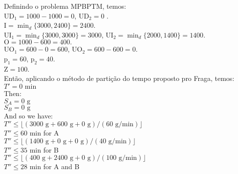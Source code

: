 \documentclass[authoryear,preprint,12pt]{elsarticle}
\begin{document}
Definindo o problema MPBPTM, temos: \\

$\textrm{UD}_{1} = 1000 - 1000 = 0$,
$\textrm{UD}_{2} = 0$ . \\

$\textrm{I} = \min_{d} \{3000, 2400\} = 2400$. \\

$ \textrm{UI}_{1} = \min_{d} \{3000, 3000\} = 3000 $,
$ \textrm{UI}_{2} = \min_{d} \{2000, 1400\} = 1400 $. \\

$\textrm{O} = 1000 - 600 = 400.$ \\

$\textrm{UO}_{1} = 600 - 0 = 600$, 
$\textrm{UO}_{2} = 600 - 600 = 0$. \\

$\textrm{p}_{1} = 60$,
$\textrm{p}_{2} = 40$.  \\

$\textrm{Z} = 100$.  \\

Então, aplicando o método de partição do tempo proposto pro Fraga, temos: \\

$T' = 0 \textrm{ min}$ \\

Then:\\

$S_A = 0 \textrm{ g}$ \\

$S_B = 0 \textrm{ g}$ \\

And so we have: \\

$T'' \leq \lfloor{(3000 \textrm{ g} + 600 \textrm{ g} + 0 \textrm{ g}) / (60 \textrm{ g}/\textrm{min})}\rfloor$ \\

$T'' \leq 60 \textrm{ min}$ \quad for A \\

$T'' \leq \lfloor{(1400 \textrm{ g} + 0 \textrm{ g} + 0 \textrm{ g}) / (40 \textrm{ g}/\textrm{min})}\rfloor$ \\

$T'' \leq 35 \textrm{ min}$ \quad for B \\

$T'' \leq \lfloor{(400 \textrm{ g} + 2400 \textrm{ g} + 0 \textrm{ g}) / (100 \textrm{ g}/\textrm{min})}\rfloor$ \\

$T'' \leq 28 \textrm{ min}$ \quad for A and B \\
\end{document}

